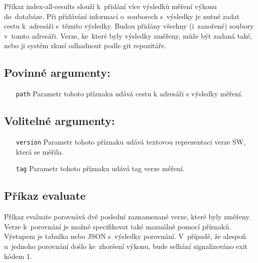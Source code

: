 Příkaz index-all-results slouží k~přidání více výsledků měření výkonu do~databáze.
Při přidávání informací o~souborech s~výsledky je nutné zadat cestu k~adresáři s~těmito výsledky.
Budou přidány všechny (i~zanořené) soubory v~tomto adresáři.
Verze, ke~které byly výsledky změřeny, může být zadaná také, nebo ji systém zkusí odhadnout
podle git repozitáře.

\subsection*{Povinné argumenty:}
\begin{itemize}[label=\texttt{\textbf{\textendash}}]
    \item[\texttt{path}] Parametr tohoto příznaku udává cestu k adresáři s výsledky měření.
\end{itemize}

\subsection*{Volitelné argumenty:}
\begin{itemize}[label=\texttt{\textbf{\textendash}}]
    \item[\texttt{version}] Parametr tohoto příznaku udává textovou reprezentaci verze SW, která se měřila.
    \item[\texttt{tag}] Parametr tohoto příznaku udává tag verze měření.
\end{itemize}

\subsection{Příkaz evaluate}

Příkaz evaluate porovnává dvě poslední zaznamenané verze, které byly změřeny.
Verze k~porovnání je možné specifikovat také manuálně pomocí příznaků. Výstupem
je tabulka nebo JSON s~výsledky porovnání. V~případě, že alespoň u~jednoho porovnání
došlo ke~zhoršení výkonu, bude selhání signalizováno exit kódem 1.

